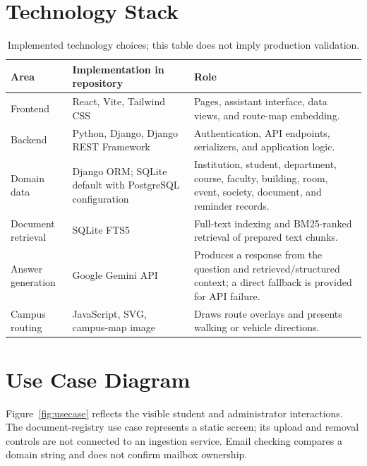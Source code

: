 \documentclass[11pt,a4paper]{report}
\begin{document}
\section{Technology Stack}
\begin{table}[htbp]
\centering
\small
\begin{tabularx}{\linewidth}{@{}p{2.7cm}p{4cm}Y@{}}
\toprule
\textbf{Area} & \textbf{Implementation in repository} & \textbf{Role} \\
\midrule
Frontend & React, Vite, Tailwind CSS & Pages, assistant interface, data views, and route-map embedding. \\
Backend & Python, Django, Django REST Framework & Authentication, API endpoints, serializers, and application logic. \\
Domain data & Django ORM; SQLite default with PostgreSQL configuration & Institution, student, department, course, faculty, building, room, event, society, document, and reminder records. \\
Document retrieval & SQLite FTS5 & Full-text indexing and BM25-ranked retrieval of prepared text chunks. \\
Answer generation & Google Gemini API & Produces a response from the question and retrieved/structured context; a direct fallback is provided for API failure. \\
Campus routing & JavaScript, SVG, campus-map image & Draws route overlays and presents walking or vehicle directions. \\
\bottomrule
\end{tabularx}
\caption{Implemented technology choices; this table does not imply production validation.}
\label{tab:stack}
\end{table}

\clearpage
\section{Use Case Diagram}
Figure~\ref{fig:usecase} reflects the visible student and administrator
interactions. The document-registry use case represents a static screen; its
upload and removal controls are not connected to an ingestion service. Email
checking compares a domain string and does not confirm mailbox ownership.
\end{document}
